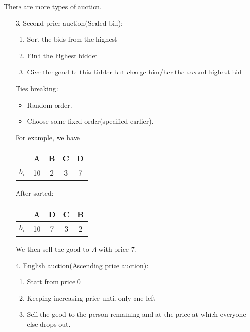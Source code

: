 \begin{eg}
	There are more types of auction.
	\begin{enumerate}
		\item[3.] Second-price auction(Sealed bid):
			\begin{enumerate}
				\item Sort the bids from the highest
				\item Find the highest bidder
				\item Give the good to this bidder but charge him/her the second-highest bid.
			\end{enumerate}
			\par Ties breaking:
			\begin{itemize}
				\item Random order.
				\item Choose some fixed order(specified earlier).
			\end{itemize}
			\begin{eg}
				For example, we have
				\begin{table}[H]
					\centering
					\begin{tabular}{c|c|c|c|c}
						\toprule
						          & A  & B & C & D \\
						\midrule
						\(b_{i}\) & 10 & 2 & 3 & 7 \\
						\bottomrule
					\end{tabular}
				\end{table}
				After sorted:
				\begin{table}[H]
					\centering
					\begin{tabular}{c|c|c|c|c}
						\toprule
						          & A  & D & C & B \\
						\midrule
						\(b_{i}\) & 10 & 7 & 3 & 2 \\
						\bottomrule
					\end{tabular}
				\end{table}
				We then sell the good to \(A\) with price \(7\).
			\end{eg}
		\item[4.] English auction(Ascending price auction):
			\begin{enumerate}
				\item Start from price \(0\)
				\item Keeping increasing price until only one left
				\item Sell the good to the person remaining and at the price at which everyone else drops out.
			\end{enumerate}

\end{enumerate}
\end{eg}
